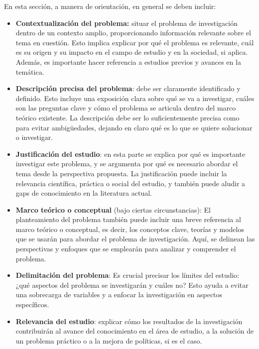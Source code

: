 \documentclass[a4paper,12pt]{article}
\begin{document}
En esta sección, a manera de orientación, en general se deben incluir:
\begin{itemize}
	\item \textbf{Contextualización del problema:} situar el problema de investigación dentro de un contexto amplio, proporcionando información relevante sobre el tema en cuestión. Esto implica explicar por qué el problema es relevante, cuál es su origen y su impacto en el campo de estudio y en la sociedad, si aplica. Además, es importante hacer referencia a estudios previos y avances en la temática.
\end{itemize}
\begin{itemize}
	\item \textbf{Descripción precisa del problema}: debe ser claramente identificado y definido. Esto incluye una exposición clara sobre qué se va a investigar, cuáles son las preguntas clave y cómo el problema se articula dentro del marco teórico existente. La descripción debe ser lo suficientemente precisa como para evitar ambigüedades, dejando en claro qué es lo que se quiere solucionar o investigar.
\end{itemize}
\begin{itemize}
	\item \textbf{Justificación del estudio}: en esta parte se explica por qué es importante investigar este problema, y se argumenta por qué es necesario abordar el tema desde la perspectiva propuesta. La justificación puede incluir la relevancia científica, práctica o social del estudio, y también puede aludir a gaps de conocimiento en la literatura actual.
\end{itemize}

\begin{itemize}
	\item\textbf{ Marco teórico o conceptual }(bajo ciertas circunstancias): El planteamiento del problema también puede incluir una breve referencia al marco teórico o conceptual, es decir, los conceptos clave, teorías y modelos que se usarán para abordar el problema de investigación. Aquí, se delinean las perspectivas y enfoques que se emplearán para analizar y comprender el problema.
\end{itemize}
\begin{itemize}
	\item \textbf{Delimitación del problema}: Es crucial precisar los límites del estudio: ¿qué aspectos del problema se investigarán y cuáles no? Esto ayuda a evitar una sobrecarga de variables y a enfocar la investigación en aspectos específicos.
\end{itemize}
\begin{itemize}
	\item \textbf{Relevancia del estudio}: explicar cómo los resultados de la investigación contribuirán al avance del conocimiento en el área de estudio, a la solución de un problema práctico o a la mejora de políticas, si es el caso.
\end{itemize}
\end{document}
